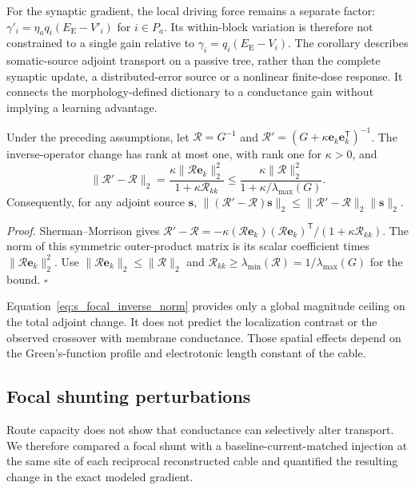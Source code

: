 For the synaptic gradient, the local driving force remains a separate factor:
$\gamma'_i=\eta_a q_i(E_{\mathrm E}-V'_i)$ for $i\in P_a$.
Its within-block variation is therefore not constrained to a single gain
relative to $\gamma_i=q_i(E_{\mathrm E}-V_i)$. The corollary describes
somatic-source adjoint transport on a passive tree, rather than the complete
synaptic update, a distributed-error source or a nonlinear finite-dose
response. It connects the morphology-defined dictionary to a conductance
gain without implying a learning advantage.

\begin{corollary}
Under the preceding assumptions, let $\mathcal R=G^{-1}$ and
$\mathcal R'=(G+\kappa\bm e_k\bm e_k^{\mathsf T})^{-1}$. The inverse-operator change has
rank at most one, with rank one for $\kappa>0$, and
\begin{equation}
\lVert \mathcal R'-\mathcal R\rVert_2
=\frac{\kappa\lVert \mathcal R\bm e_k\rVert_2^2}
{1+\kappa \mathcal R_{kk}}
\leq
\frac{\kappa\lVert \mathcal R\rVert_2^2}
{1+\kappa/\lambda_{\max}(G)}.
\label{eq:s_focal_inverse_norm}
\end{equation}
Consequently, for any adjoint source $\bm s$,
$\lVert(\mathcal R'-\mathcal R)\bm s\rVert_2\leq
\lVert \mathcal R'-\mathcal R\rVert_2\lVert\bm s\rVert_2$.
\end{corollary}

\noindent\emph{Proof.}
Sherman--Morrison gives
$\mathcal R'-\mathcal R=-\kappa(\mathcal R\bm e_k)(\mathcal R\bm e_k)^{\mathsf T}/
(1+\kappa \mathcal R_{kk})$.
The norm of this symmetric outer-product matrix is its scalar coefficient times
$\lVert \mathcal R\bm e_k\rVert_2^2$. Use
$\lVert \mathcal R\bm e_k\rVert_2\leq\lVert \mathcal R\rVert_2$ and
$\mathcal R_{kk}\geq\lambda_{\min}(\mathcal R)=1/\lambda_{\max}(G)$ for the bound.
\hfill$\square$

Equation~\ref{eq:s_focal_inverse_norm} provides only a global magnitude ceiling
on the total adjoint change. It does not predict the localization contrast or
the observed crossover with membrane conductance. Those spatial effects depend
on the Green's-function profile and electrotonic length constant of the cable.

\subsection{Focal shunting perturbations}
\label{note:focal}

Route capacity does not show that conductance can selectively alter transport.
We therefore compared a focal shunt with a baseline-current-matched injection
at the same site of each reciprocal reconstructed cable and quantified the
resulting change in the exact modeled gradient.

